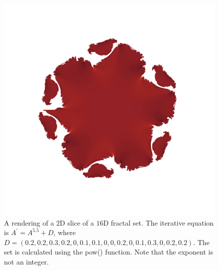 \documentclass[12pt]{article}
\begin{document}
\begin{figure} 
\centering
  \includegraphics[width = 6 in]{16d_pow5_5.png}
  \caption{A rendering of a $2$D slice of a $16$D fractal set.
The iterative equation is $A^{\prime} = A^{5.5} + D$, where $D = (0.2, 0.2, 0.3, 0.2, 0, 0.1, 0.1, 0, 0, 0.2, 0, 0.1, 0.3, 0, 0.2, 0.2)$.
The set is calculated using the pow() function.
Note that the exponent is not an integer.
}
\end{figure}
\end{document}
